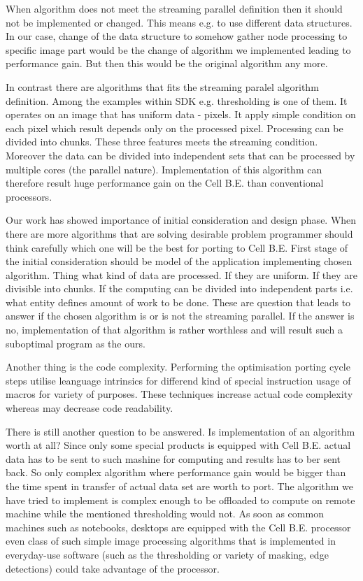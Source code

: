 \par
When algorithm does not meet the streaming parallel definition then it should not be implemented or changed.
This means e.g. to use different data structures.
In our case, change of the data structure to somehow gather node processing to specific image part would be the change of algorithm we implemented leading to performance gain.
But then this would be the original algorithm any more.

\par
In contrast there are algorithms that fits the streaming paralel algorithm definition.
Among the examples within SDK e.g. thresholding is one of them.
It operates on an image that has uniform data - pixels.
It apply simple condition on each pixel which result depends only on the processed pixel.
Processing can be divided into chunks.
These three features meets the streaming condition.
Moreover the data can be divided into independent sets that can be processed by multiple cores (the parallel nature).
Implementation of this algorithm can therefore result huge performance gain on the Cell B.E. than conventional processors.

\par
Our work has showed importance of initial consideration and design phase.
When there are more algorithms that are solving desirable problem programmer should think carefully which one will be the best for porting to Cell B.E.
First stage of the initial consideration should be model of the application implementing chosen algorithm.
Thing what kind of data are processed.
If they are uniform.
If they are divisible into chunks.
If the computing can be divided into independent parts i.e. what entity defines amount of work to be done.
These are question that leads to answer if the chosen algorithm is or is not the streaming parallel.
If the answer is no, implementation of that algorithm is rather worthless and will result such a suboptimal program as the ours.

\par
Another thing is the code complexity.
Performing the optimisation porting cycle steps utilise leanguage intrinsics for differend kind of special instruction usage of macros for variety of purposes.
These techniques increase actual code complexity whereas may decrease code readability.

\par
There is still another question to be answered.
Is implementation of an algorithm worth at all?
Since only some special products is equipped with Cell B.E. actual data has to be sent to such mashine for computing and results has to ber sent back.
So only complex algorithm where performance gain would be bigger than the time spent in transfer of actual data set are worth to port.
The algorithm we have tried to implement is complex enough to be offloaded to compute on remote machine while the mentioned thresholding would not.
As soon as common machines such as notebooks, desktops are equipped with the Cell B.E. processor even class of such simple image processing algorithms that is implemented in everyday-use software (such as the thresholding or variety of masking, edge detections) could take advantage of the processor.

